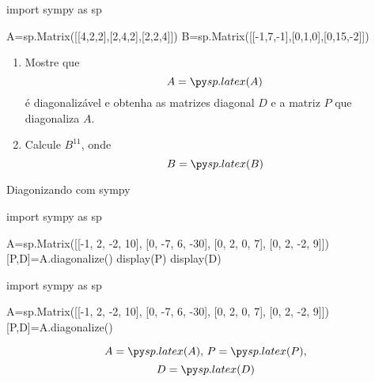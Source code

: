 \begin{frame}[label=autovalores,fragile=singleslide]{}

\begin{casa}
\begin{pycode}
import sympy as sp

A=sp.Matrix([[4,2,2],[2,4,2],[2,2,4]])
B=sp.Matrix([[-1,7,-1],[0,1,0],[0,15,-2]])
\end{pycode}
\begin{enumerate}
\item Mostre que 
\[A=\pyl{A}\]
é diagonalizável e obtenha as matrizes diagonal $D$ e a matriz $P$ que diagonaliza $A$.

\item Calcule $B^{11}$, onde 
\[B=\pyl{B}\]
\end{enumerate}

\end{casa}
\end{frame}

\begin{frame}[label=autovalores,,fragile=singleslide]{Diagonizando com sympy}
	\begin{footnotesize}
\begin{pyverbatim}
import sympy as sp

A=sp.Matrix([[-1, 2, -2, 10],
[0, -7, 6, -30],
[0, 2, 0, 7],
[0, 2, -2, 9]])
[P,D]=A.diagonalize()
display(P)
display(D)
\end{pyverbatim}
	\end{footnotesize}		

\begin{pycode}
import sympy as sp

A=sp.Matrix([[-1, 2, -2, 10], [0, -7, 6, -30], [0, 2, 0, 7], [0, 2, -2, 9]])
[P,D]=A.diagonalize()
\end{pycode}
\[A=\pyl{A},\, P=\pyl{P},\]
\[D=\pyl{D}\]

\end{frame}

\begin{frame}[label=autovalores]{}


\end{frame}
